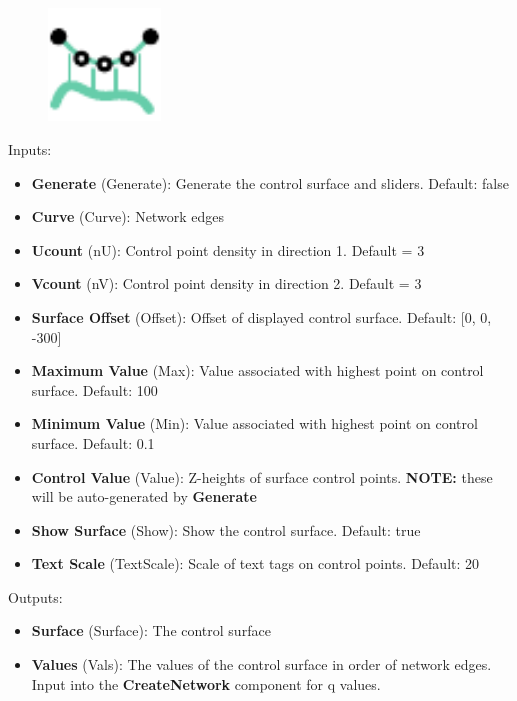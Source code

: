\begin{figure}[h]
    \centering
    \includegraphics[width=3cm]{Figures/SurfQ}
\end{figure}

Inputs:
\begin{itemize}
    \setlength\itemsep{0.05em}
    \item \textbf{Generate} (Generate): Generate the control surface and sliders. {\color{gray} Default: false}
    \item \textbf{Curve} (Curve): Network edges
    \item \textbf{Ucount} (nU): Control point density in direction 1. {\color{gray} Default = 3}
    \item \textbf{Vcount} (nV): Control point density in direction 2. {\color{gray} Default = 3}
    \item \textbf{Surface Offset} (Offset): Offset of displayed control surface. {\color{gray} Default: [0, 0, -300]}
    \item \textbf{Maximum Value} (Max): Value associated with highest point on control surface. {\color{gray} Default: 100}
    \item \textbf{Minimum Value} (Min): Value associated with highest point on control surface. {\color{gray} Default: 0.1}
    \item \textbf{Control Value} (Value): Z-heights of surface control points. {\color{kpink} \textbf{NOTE:} these will be auto-generated by \textbf{Generate}}
    \item \textbf{Show Surface} (Show): Show the control surface. {\color{gray} Default: true}
    \item \textbf{Text Scale} (TextScale): Scale of text tags on control points. {\color{gray} Default: 20}
\end{itemize}

Outputs:
\begin{itemize}
    \setlength\itemsep{0.05em}
    \item \textbf{Surface} (Surface): The control surface
    \item \textbf{Values} (Vals): The values of the control surface in order of network edges. Input into the \textbf{CreateNetwork} component for q values.
\end{itemize}

